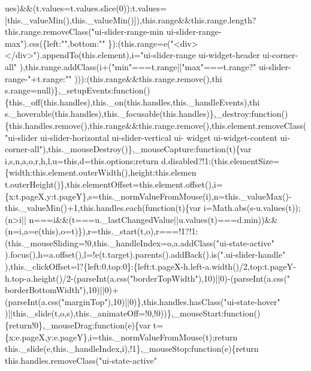 \begin{DoxyCode}
{      ues)&&(t.values=t.values.slice(0)):t.values=[this.\_valueMin(),this.\_valueMin()]),this.range&&this.range.length?this.range.removeClass("}ui-slider-range-min ui-slider-range-max\textcolor{stringliteral}{").css(\{left:"}\textcolor{stringliteral}{",bottom:"}\textcolor{stringliteral}{"
      \}):(this.range=e("}<div></div>\textcolor{stringliteral}{").appendTo(this.element),i="}ui-slider-range ui-widget-header ui-corner-all\textcolor{stringliteral}{"
      ),this.range.addClass(i+("}min\textcolor{stringliteral}{"===t.range||"}max\textcolor{stringliteral}{"===t.range?"} ui-slider-range-\textcolor{stringliteral}{"+t.range:"}\textcolor{stringliteral}{"
      ))):(this.range&&this.range.remove(),thi
      s.range=null)\},\_setupEvents:function()\{this.\_off(this.handles),this.\_on(this.handles,this.\_handleEvents),thi
      s.\_hoverable(this.handles),this.\_focusable(this.handles)\},\_destroy:function()\{this.handles.remove(),this.range&&this.range.remove(),this.element.removeClass("}ui-slider ui-slider-horizontal ui-slider-vertical ui-
      widget ui-widget-content ui-corner-all\textcolor{stringliteral}{"),this.\_mouseDestroy()\},\_mouseCapture:function(t)\{var
       i,s,n,a,o,r,h,l,u=this,d=this.options;return
       d.disabled?!1:(this.elementSize=\{width:this.element.outerWidth(),height:this.elemen
      t.outerHeight()\},this.elementOffset=this.element.offset(),i=\{x:t.pageX,y:t.pageY\},s=this.\_normValueFromMouse(i),n=this.\_valueMax()-this.\_valueMin()+1,this.handles.each(function(t)\{var
       i=Math.abs(s-u.values(t));(n>i||
      n===i&&(t===u.\_lastChangedValue||u.values(t)===d.min))&&(n=i,a=e(this),o=t)\}),r=this.\_start(t,o),r===!1?!1:(this.\_mouseSliding=!0,this.\_handleIndex=o,a.addClass("}ui-state-active\textcolor{stringliteral}{"
      ).focus(),h=a.offset(),l=!e(t.target).parents().addBack().is("}.ui-slider-handle\textcolor{stringliteral}{"
      ),this.\_clickOffset=l?\{left:0,top:0\}:\{left:t.pageX-h.left-a.width()/2,top:t.pageY-h.top-a.height()/2-(parseInt(a.css("}borderTopWidth\textcolor{stringliteral}{"),10)||0)-(parseInt(a.css("}
      borderBottomWidth\textcolor{stringliteral}{"),10)||0)+(parseInt(a.css("}marginTop\textcolor{stringliteral}{"),10)||0)\},this.handles.hasClass("}ui-state-hover\textcolor{stringliteral}{"
      )||this.\_slide(t,o,s),this.\_animateOff=!0,!0))\},\_mouseStart:function()\{return!0\},\_mouseDrag:function(e)\{var
       t=\{x:e.pageX,y:e.pageY\},i=this.\_normValueFromMouse(t);return
       this.\_slide(e,this.\_handleIndex,i),!1\},\_mouseStop:function(e)\{return this.handles.removeClass("}ui-state-active\textcolor{stringliteral}{"
}
\end{DoxyCode}
